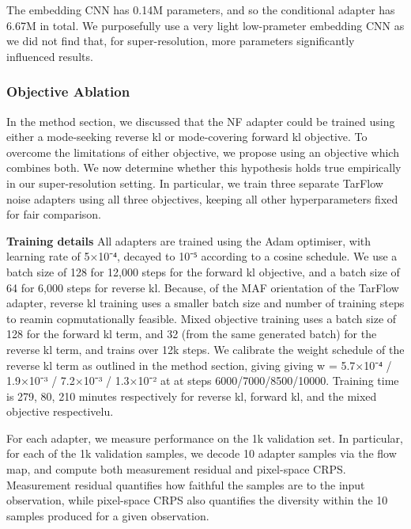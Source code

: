 \documentclass[12pt,a4paper]{report}
\begin{document}
The embedding CNN has 0.14M parameters, and so the conditional adapter has 6.67M in total. We purposefully use a very light low-prameter embedding CNN as we did not find that, for super-resolution, more parameters significantly influenced results. 

\subsubsection{Objective Ablation}
In the method section, we discussed that the NF adapter could be trained using either a mode-seeking reverse kl or mode-covering forward kl objective. To overcome the limitations of either objective, we propose using an objective which combines both. 
We now determine whether this hypothesis holds true empirically in our super-resolution setting.  
In particular, we train three separate TarFlow noise adapters using all three objectives, keeping all other hyperparameters fixed for fair comparison. 

\textbf{Training details}
All adapters are trained using the Adam optimiser, with learning rate of 5×10⁻⁴, decayed to 10⁻⁵ according to a cosine schedule. 
We use a batch size of 128 for 12,000 steps for the forward kl objective, and a batch size of 64 for 6,000 steps for reverse kl. 
Because, of the MAF orientation of the TarFlow adapter, reverse kl training uses a smaller batch size and number of training steps to reamin copmutationally feasible. 
Mixed objective training uses a batch size of 128 for the forward kl term, and 32 (from the same generated batch) for the reverse kl term, and trains over 12k steps. 
We calibrate the weight schedule of the reverse kl term as outlined in the method section, giving giving w = 5.7×10⁻⁴ / 1.9×10⁻³ / 7.2×10⁻³ / 1.3×10⁻² at at steps 6000/7000/8500/10000.   
Training time is 279, 80, 210 minutes respectively for reverse kl, forward kl, and the mixed objective respectivelu. 

For each adapter, we measure performance on the 1k validation set. 
In particular, for each of the 1k validation samples, we decode 10 adapter samples via the flow map, and compute both measurement residual and pixel-space CRPS. 
Measurement residual quantifies how faithful the samples are to the input observation, while pixel-space CRPS also quantifies the diversity within the 10 samples produced for a given observation.  
\end{document}
